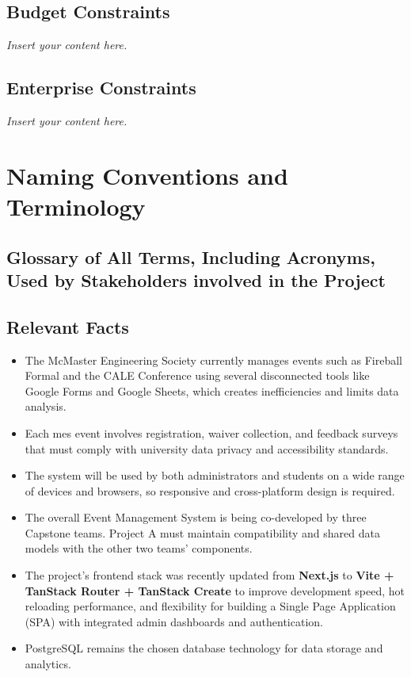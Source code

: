 \documentclass[12pt]{article}
\newcommand{\lips}{\textit{Insert your content here.}}
\begin{document}
\subsection{Budget Constraints}
\lips
\subsection{Enterprise Constraints}
\lips

\section{Naming Conventions and Terminology}
\subsection{Glossary of All Terms, Including Acronyms, Used by Stakeholders
involved in the Project}
\glsaddall
\printnoidxglossaries

\subsection{Relevant Facts}

\begin{itemize}
    \item The McMaster Engineering Society currently manages events such as Fireball Formal and the CALE Conference
      using several disconnected tools like Google Forms and Google Sheets, which creates inefficiencies and limits data
      analysis.
    \item Each \gls{mes} event involves registration, waiver collection, and feedback surveys that must comply with
      university data privacy and accessibility standards.
    \item The system will be used by both administrators and students on a wide range of devices and browsers, so
      responsive and cross-platform design is required.
    \item The overall Event Management System is being co-developed by three Capstone teams. Project A must maintain
      compatibility and shared data models with the other two teams’ components.
    \item The project’s frontend stack was recently updated from \textbf{Next.js} to \textbf{Vite + TanStack Router +
      TanStack Create} to improve development speed, hot reloading performance, and flexibility for building a Single
      Page Application (SPA) with integrated admin dashboards and authentication.
    \item PostgreSQL remains the chosen database technology for data storage and analytics.
\end{itemize}
\end{document}
